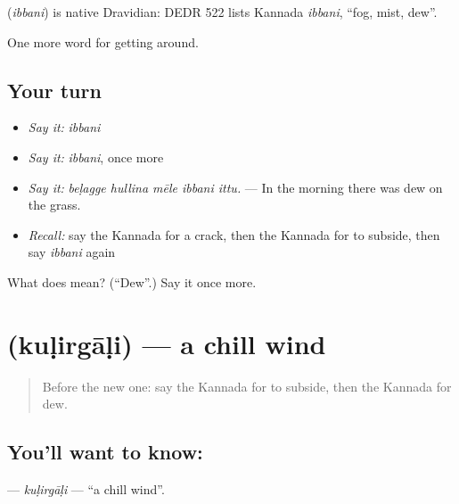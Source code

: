 \begin{cousinweb}
\textbf{} (\emph{ibbani}) is native Dravidian: DEDR 522 lists Kannada \emph{ibbani}, \textquotedblleft{}fog, mist, dew\textquotedblright{}.
\end{cousinweb}

\begin{grammarlens}[title={What you've built}]
One more word for getting around.
\end{grammarlens}

\subsection*{Your turn}
\begin{itemize}
\raggedright
  \item \emph{Say it:} \emph{ibbani}
  \item \emph{Say it:} \emph{ibbani}, once more
  \item \emph{Say it:} \emph{beḷagge hullina mēle ibbani ittu.} — In the morning there was dew on the grass.
  \item \emph{Recall:} say the Kannada for a crack, then the Kannada for to subside, then say \emph{ibbani} again
\end{itemize}

\begin{tcolorbox}[breakable,colback=teal!4,colframe=teal!35!black,title={Before you move on}]
What does  mean? (\textquotedblleft{}Dew\textquotedblright{}.) Say it once more.
\end{tcolorbox}
\section[\texorpdfstring{\kn{ಕುಳಿರ್ಗಾಳಿ} (kuḷirgāḷi)}{ಕುಳಿರ್ಗಾಳಿ (kuḷirgāḷi)}]{ (kuḷirgāḷi) — a chill wind}

\label{lesson:KA-C489-kulirgali}



\begin{quote}
Before the new one: say the Kannada for to subside, then the Kannada for dew.
\end{quote}

\subsection*{You'll want to know: }
\textbf{} — \emph{kuḷirgāḷi} — \textquotedblleft{}a chill wind\textquotedblright{}.

